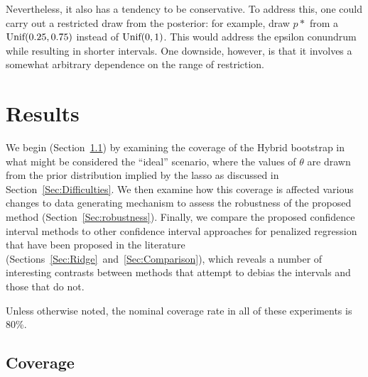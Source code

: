  Nevertheless, it also has a tendency to be conservative. To address this, one could carry out a restricted draw from the posterior: for example, draw $p*$ from a $\textrm{Unif}(0.25, 0.75)$ instead of $\textrm{Unif}(0,1)$. This would address the epsilon conundrum while resulting in shorter intervals. One downside, however, is that it involves a somewhat arbitrary dependence on the range of restriction.



\section{Results}
\label{Sec:results}

We begin (Section~\ref{Sec:Coverage}) by examining the coverage of the Hybrid bootstrap in what might be considered the ``ideal'' scenario, where the values of $\theta$ are drawn from the prior distribution implied by the lasso as discussed in Section~\ref{Sec:Difficulties}. We then examine how this coverage is affected various changes to data generating mechanism to assess the robustness of the proposed method (Section~\ref{Sec:robustness}). Finally, we compare the proposed confidence interval methods to other confidence interval approaches for penalized regression that have been proposed in the literature (Sections~\ref{Sec:Ridge}~and~\ref{Sec:Comparison}), which reveals a number of interesting contrasts between methods that attempt to debias the intervals and those that do not.

Unless otherwise noted, the nominal coverage rate in all of these experiments is 80\%.

\subsection{Coverage}\label{Sec:Coverage}


